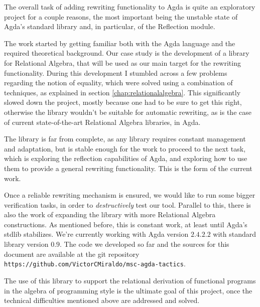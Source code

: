 The overall task of adding rewriting functionality to Agda is quite an exploratory 
project for a couple reasons, the most important being the unstable state of Agda's
standard library and, in particular, of the Reflection module. 

The work started by getting familiar both with the Agda language and the required theoretical background. 
Our case study is the development of a library for Relational Algebra, 
that will be used as our main target for the rewriting functionality.
During this development I stumbled across a few problems regarding the notion of equality, 
which were solved using a combination of techniques, as explained in section \ref{chap:relationalalgebra}.
This significantly slowed down the project, mostly because one had to be sure to get
this right, otherwise the library wouldn't be suitable for automatic rewriting, as is the case
of current state-of-the-art Relational Algebra libraries, in Agda.

The library is far from complete, as any library requires constant
management and adaptation, but is stable enough for the work to proceed to the next task, which is
exploring the reflection capabilities of Agda, and exploring how to use them to provide 
a general rewriting functionality. This is the form of the current work.

Once a reliable rewriting mechanism is ensured, we would like to run some bigger verification
tasks, in order to \emph{destructively} test our tool. Parallel to this, there is also the
work of expanding the library with more Relational Algebra constructions. As mentioned before,
this is constant work, at least until Agda's stdlib stabilizes. We're currently working with
Agda version $2.4.2.2$ with standard library version $0.9$. The code we developed so far and
the sources for this document are available at the git repository \texttt{https://github.com/VictorCMiraldo/msc-agda-tactics}.

The use of this library to support the relational derivation of functional programs in
the algebra of programming style is the ultimate goal of this project, once the technical
difficulties mentioned above are addressed and solved.
